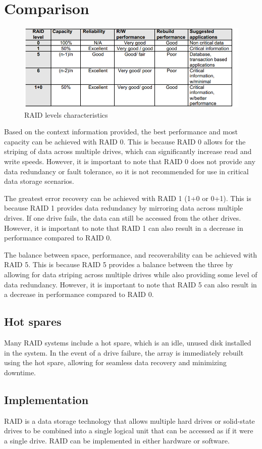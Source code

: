 \section{Comparison}

\begin{figure}[H]
    \centering
    \includegraphics[width=0.6\linewidth]{images/levchar.png}
    \caption{RAID levels characteristics}
\end{figure}
Based on the context information provided, the best performance and most capacity can be achieved with RAID 0. 
This is because RAID 0 allows for the striping of data across multiple drives, which can significantly increase read and write speeds. 
However, it is important to note that RAID 0 does not provide any data redundancy or fault tolerance, so it is not recommended for use in critical data storage scenarios.

The greatest error recovery can be achieved with RAID 1 (1+0 or 0+1). This is because RAID 1 provides data redundancy by mirroring data across multiple drives. 
If one drive fails, the data can still be accessed from the other drives. 
However, it is important to note that RAID 1 can also result in a decrease in performance compared to RAID 0.

The balance between space, performance, and recoverability can be achieved with RAID 5. 
This is because RAID 5 provides a balance between the three by allowing for data striping across multiple drives while also providing some level of data redundancy. 
However, it is important to note that RAID 5 can also result in a decrease in performance compared to RAID 0.

\subsection{Hot spares}
Many RAID systems include a hot spare, which is an idle, unused disk installed in the system.
In the event of a drive failure, the array is immediately rebuilt using the hot spare, allowing for seamless data recovery and minimizing downtime.

\subsection{Implementation}
RAID is a data storage technology that allows multiple hard drives or solid-state drives to be combined into a single logical unit that can be accessed as if it were a single drive. 
RAID can be implemented in either hardware or software.

